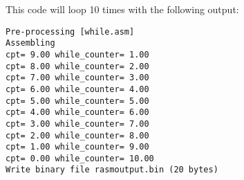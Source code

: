 \begin{xen}
This code will loop 10 times with the following output:
\end{xen}

\begin{verbatim}
Pre-processing [while.asm]
Assembling
cpt= 9.00 while_counter= 1.00
cpt= 8.00 while_counter= 2.00
cpt= 7.00 while_counter= 3.00
cpt= 6.00 while_counter= 4.00
cpt= 5.00 while_counter= 5.00
cpt= 4.00 while_counter= 6.00
cpt= 3.00 while_counter= 7.00
cpt= 2.00 while_counter= 8.00
cpt= 1.00 while_counter= 9.00
cpt= 0.00 while_counter= 10.00
Write binary file rasmoutput.bin (20 bytes)
\end{verbatim}

